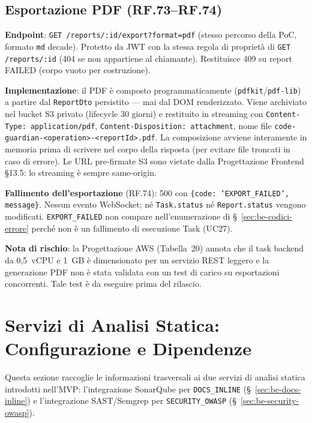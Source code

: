 \documentclass[11pt,a4paper]{article}
\begin{document}
\subsection{Esportazione PDF (RF.73--RF.74)}
\label{sec:be-report-export}

\textbf{Endpoint}: \texttt{GET /reports/:id/export?format=pdf} (stesso percorso della PoC, formato \texttt{md} decade). Protetto da JWT con la stessa regola di proprietà di \texttt{GET /reports/:id} (404 se non appartiene al chiamante). Restituisce 409 su report FAILED (corpo vuoto per costruzione).

\textbf{Implementazione}: il PDF è composto programmaticamente (\texttt{pdfkit}/\texttt{pdf-lib}) a partire dal \texttt{ReportDto} persistito --- mai dal DOM renderizzato. Viene archiviato nel bucket S3 privato (lifecycle 30 giorni) e restituito in streaming con \texttt{Content-Type: application/pdf}, \texttt{Content-Disposition: attachment}, nome file \texttt{code-guardian-<operation>-<reportId>.pdf}. La composizione avviene interamente in memoria prima di scrivere nel corpo della risposta (per evitare file troncati in caso di errore). Le URL pre-firmate S3 sono vietate dalla Progettazione Frontend §13.5: lo streaming è sempre same-origin.

\textbf{Fallimento dell'esportazione} (RF.74): 500 con \texttt{\{code: 'EXPORT\_FAILED', message\}}. Nessun evento WebSocket; né \texttt{Task.status} né \texttt{Report.status} vengono modificati. \texttt{EXPORT\_FAILED} non compare nell'enumerazione di §~\ref{sec:be-codici-errore} perché non è un fallimento di esecuzione Task (UC27).

\textbf{Nota di rischio}: la Progettazione AWS (Tabella~20) annota che il task backend da 0,5~vCPU e 1~GB è dimensionato per un servizio REST leggero e la generazione PDF non è stata validata con un test di carico su esportazioni concorrenti. Tale test è da eseguire prima del rilascio.

\section{Servizi di Analisi Statica: Configurazione e Dipendenze}
\label{sec:be-analisi-statica}

Questa sezione raccoglie le informazioni trasversali ai due servizi di analisi statica introdotti nell'MVP: l'integrazione SonarQube per \texttt{DOCS\_INLINE} (\S~\ref{sec:be-docs-inline}) e l'integrazione SAST/Semgrep per \texttt{SECURITY\_OWASP} (\S~\ref{sec:be-security-owasp}).
\end{document}
